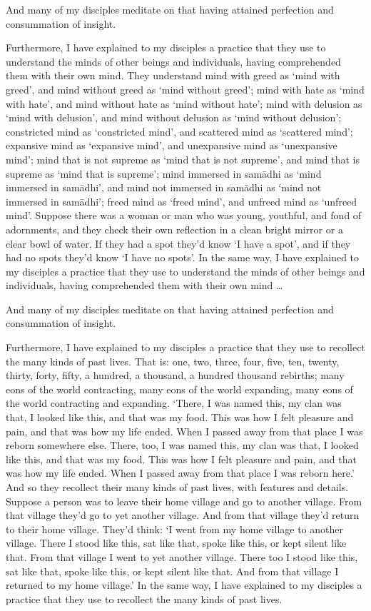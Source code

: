 \documentclass[12pt,openany]{book}%
\begin{document}
And many of my disciples meditate on that having attained perfection and consummation of insight. 

Furthermore, I have explained to my disciples a practice that they use to understand the minds of other beings and individuals, having comprehended them with their own mind. They understand mind with greed as ‘mind with greed’, and mind without greed as ‘mind without greed’; mind with hate as ‘mind with hate’, and mind without hate as ‘mind without hate’; mind with delusion as ‘mind with delusion’, and mind without delusion as ‘mind without delusion’; constricted mind as ‘constricted mind’, and scattered mind as ‘scattered mind’; expansive mind as ‘expansive mind’, and unexpansive mind as ‘unexpansive mind’; mind that is not supreme as ‘mind that is not supreme’, and mind that is supreme as ‘mind that is supreme’; mind immersed in \textsanskrit{samādhi} as ‘mind immersed in \textsanskrit{samādhi}’, and mind not immersed in \textsanskrit{samādhi} as ‘mind not immersed in \textsanskrit{samādhi}’; freed mind as ‘freed mind’, and unfreed mind as ‘unfreed mind’. Suppose there was a woman or man who was young, youthful, and fond of adornments, and they check their own reflection in a clean bright mirror or a clear bowl of water. If they had a spot they’d know ‘I have a spot’, and if they had no spots they’d know ‘I have no spots’. In the same way, I have explained to my disciples a practice that they use to understand the minds of other beings and individuals, having comprehended them with their own mind … 

And many of my disciples meditate on that having attained perfection and consummation of insight. 

Furthermore, I have explained to my disciples a practice that they use to recollect the many kinds of past lives. That is: one, two, three, four, five, ten, twenty, thirty, forty, fifty, a hundred, a thousand, a hundred thousand rebirths; many eons of the world contracting, many eons of the world expanding, many eons of the world contracting and expanding. ‘There, I was named this, my clan was that, I looked like this, and that was my food. This was how I felt pleasure and pain, and that was how my life ended. When I passed away from that place I was reborn somewhere else. There, too, I was named this, my clan was that, I looked like this, and that was my food. This was how I felt pleasure and pain, and that was how my life ended. When I passed away from that place I was reborn here.’ And so they recollect their many kinds of past lives, with features and details. Suppose a person was to leave their home village and go to another village. From that village they’d go to yet another village. And from that village they’d return to their home village. They’d think: ‘I went from my home village to another village. There I stood like this, sat like that, spoke like this, or kept silent like that. From that village I went to yet another village. There too I stood like this, sat like that, spoke like this, or kept silent like that. And from that village I returned to my home village.’ In the same way, I have explained to my disciples a practice that they use to recollect the many kinds of past lives. 
\end{document}
